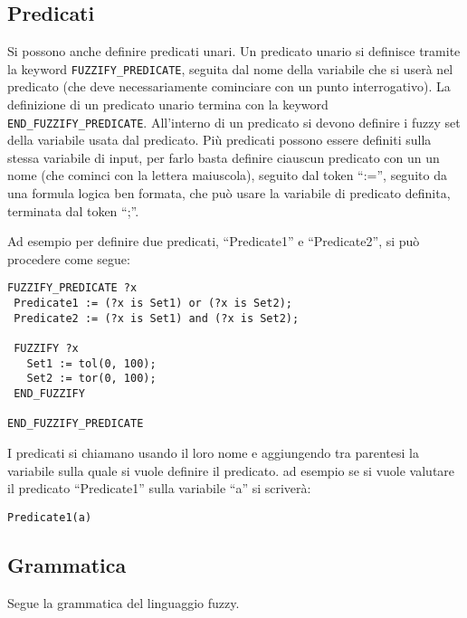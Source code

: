 \subsection{Predicati}
Si possono anche definire predicati unari. Un predicato unario si definisce tramite la keyword \verb|FUZZIFY_PREDICATE|, seguita dal nome della variabile che si userà nel predicato (che deve necessariamente cominciare con un punto interrogativo). La definizione di un predicato unario termina con la keyword \verb|END_FUZZIFY_PREDICATE|. All'interno di un predicato si devono definire i fuzzy set della variabile usata dal predicato. Più predicati possono essere definiti sulla stessa variabile di input, per farlo basta definire ciauscun predicato con un un nome (che cominci con la lettera maiuscola), seguito dal token ``:='', seguito da una formula logica ben formata, che può usare la variabile di predicato definita, terminata dal token ``;''.

Ad esempio per definire due predicati, ``Predicate1'' e ``Predicate2'', si può procedere come segue:
\begin{verbatim}
FUZZIFY_PREDICATE ?x
 Predicate1 := (?x is Set1) or (?x is Set2);
 Predicate2 := (?x is Set1) and (?x is Set2);
 
 FUZZIFY ?x
   Set1 := tol(0, 100);
   Set2 := tor(0, 100);
 END_FUZZIFY

END_FUZZIFY_PREDICATE
\end{verbatim}

I predicati si chiamano usando il loro nome e aggiungendo tra parentesi la variabile sulla quale si vuole definire il predicato. ad esempio se si vuole valutare il predicato ``Predicate1'' sulla variabile ``a'' si scriverà:
\begin{verbatim}
Predicate1(a)
\end{verbatim}

\subsection{Grammatica}

Segue la grammatica del linguaggio fuzzy.\\

